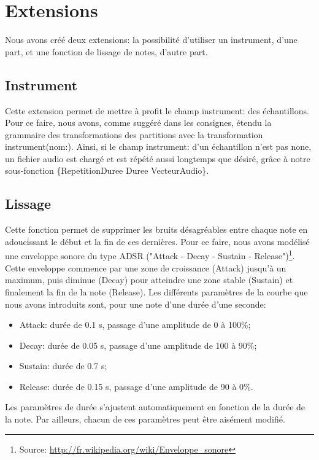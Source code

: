 \documentclass[10pt,a4paper]{article}
\begin{document}
\section{Extensions}

Nous avons créé deux extensions: la possibilité d'utiliser un instrument, d'une part, et une fonction de lissage de notes, d'autre part.

\subsection{Instrument}

Cette extension permet de mettre à profit le champ instrument: des échantillons. Pour ce faire, nous avons, comme suggéré dans les consignes, étendu la grammaire des transformations des partitions avec la transformation instrument(nom:). 
Ainsi, si le champ instrument: d'un échantillon n'est pas none, un fichier audio est chargé et est répété aussi longtemps que désiré, grâce à notre sous-fonction \{RepetitionDuree Duree VecteurAudio\}. 

\subsection{Lissage}


Cette fonction permet de supprimer les bruits désagréables entre chaque note en adoucissant le début et la fin de ces dernières. Pour ce faire, nous avons modélisé une enveloppe sonore du type ADSR ("Attack - Decay - Sustain - Release")\footnote{Source: \url{http://fr.wikipedia.org/wiki/Enveloppe_sonore}}. Cette enveloppe commence par une zone de croissance (Attack) jusqu'à un maximum, puis diminue (Decay) pour atteindre une zone stable (Sustain) et finalement la fin de la note (Release). Les différents paramètres de la courbe que nous avons introduits sont, pour une note d'une durée d'une seconde: 
\begin{itemize}
\item Attack: durée de 0.1 s, passage d'une amplitude de 0 à 100\%;
\item Decay: durée de 0.05 s, passage d'une amplitude de 100 à 90\%;
\item Sustain: durée de 0.7 s;
\item Release: durée de 0.15 s, passage d'une amplitude de 90 à 0\%.
\end{itemize}

Les paramètres de durée s'ajustent automatiquement en fonction de la durée de la note. Par ailleurs, chacun de ces paramètres peut être aisément modifié. 
\end{document}
